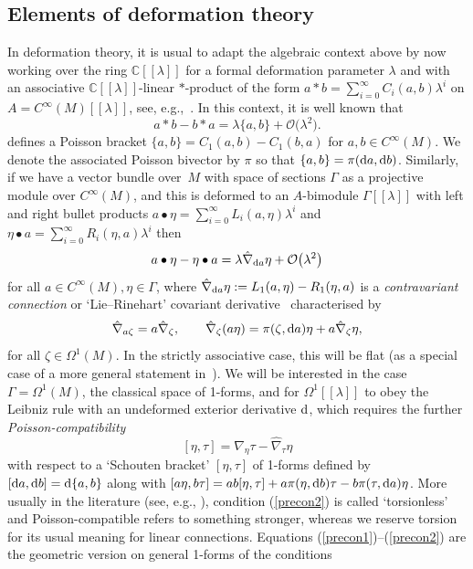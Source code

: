 \documentclass[10pt,a4paper]{amsart}
\numberwithin{equation}{section}
\newcommand{\C}{{\mathbb{C}}}
\newcommand{\<}{{\langle}}
\renewcommand{\>}{{\rangle}}
\newcommand{\extd}{{\rm d}}
\begin{document}
\subsection{Elements of deformation theory}\label{secpredef}

In deformation theory, it is usual to adapt the algebraic context above by now working over the ring $\C[[\lambda]]$ for a formal deformation parameter $\lambda$ and with an associative $\C[[\lambda]]$-linear $*$-product of the form $a*b=\sum_{i=0}^\infty C_i(a,b)\lambda^i$ on $A=C^\infty(M)[[\lambda]]$, see, e.g.,~\cite{Bur}. In this context, it is well known that
\[ a* b-b * a=\lambda\lbrace a,b\rbrace+\mathcal{O}\big(\lambda^2\big). \]
defines a Poisson bracket $\{a,b\}=C_1(a,b)-C_1(b,a)$ for $a,b\in C^\infty(M)$. We denote the associated Poisson bivector by $\pi$ so that $\lbrace a,b\rbrace=\pi(\extd a,\extd b)$. Similarly, if we have a vector bundle over~$M$ with space of sections $\Gamma$ as a projective module over $C^\infty(M)$, and this is deformed to an $A$-bimodule $\Gamma[[\lambda]]$ with left and right bullet products $a\bullet \eta=\sum_{i=0}^\infty L_i(a,\eta)\lambda^i$ and $\eta\bullet a=\sum_{i=0}^\infty R_i(\eta,a)\lambda^i$ then
\[a\bullet\eta-\eta\bullet a=\lambda\hat\nabla_{\extd a}\eta+\mathcal{O}\big(\lambda^2\big) \]
for all $a\in C^\infty(M), \eta\in \Gamma$, where $\hat\nabla_{\extd a}\eta:=L_1(a,\eta)-R_1(\eta,a)$ is a {\em contravariant connection} or `Lie--Rinehart' covariant derivative~\cite{Bur,Fer, Hue} characterised by
\begin{equation}\label{precon1} \hat\nabla_{a\zeta}=a\hat\nabla_\zeta,\qquad \hat\nabla_\zeta(a\eta)=\pi(\zeta,\extd a)\eta+ a\hat\nabla_\zeta\eta,\end{equation}
for all $\zeta\in \Omega^1(M)$. In the strictly associative case, this will be flat (as a special case of a more general statement in~\cite{Bur}). We will be interested in the case $\Gamma=\Omega^1(M)$, the classical space of 1-forms, and for $\Omega^1[[\lambda]]$ to obey the Leibniz rule with an undeformed exterior derivative $\extd$, which requires the further {\em Poisson-compatibility}
\begin{equation}\label{precon2} [\eta,\tau]=\hat{\nabla}_\eta\tau-\hat{\nabla}_\tau\eta\end{equation}
with respect to a `Schouten bracket' $[\eta,\tau]$ of 1-forms defined by $[\extd a,\extd b]=\extd\{a,b\}$ along with $[a\eta,b\tau]=ab[\eta,\tau]+a\pi(\eta,\extd b)\tau-b\pi(\tau,\extd a)\eta$. More usually in the literature (see, e.g., \cite{Fer}), condition (\ref{precon2}) is called `torsionless' and Poisson-compatible refers to something stronger, whereas we reserve torsion for its usual meaning for linear connections. Equations (\ref{precon1})--(\ref{precon2}) are the geometric version on general 1-forms of the conditions \cite{BegMa:sem,BegMa:prg, Haw}
\end{document}
